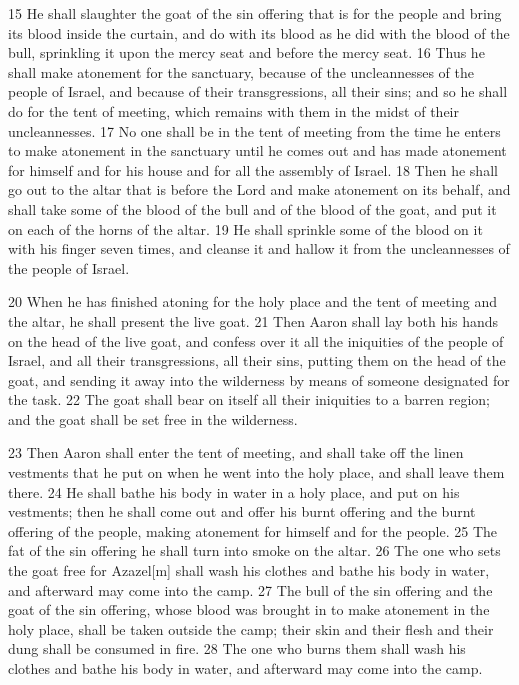 15 He shall slaughter the goat of the sin offering that is for the people and 
bring its blood inside the curtain, and do with its blood as he did with the 
blood of the bull, sprinkling it upon the mercy seat and before the mercy 
seat. 16 Thus he shall make atonement for the sanctuary, because of the 
uncleannesses of the people of Israel, and because of their transgressions, all 
their sins; and so he shall do for the tent of meeting, which remains with them 
in the midst of their uncleannesses. 17 No one shall be in the tent of meeting 
from the time he enters to make atonement in the sanctuary until he comes out 
and has made atonement for himself and for his house and for all the assembly of
Israel. 18 Then he shall go out to the altar that is before the Lord and make 
atonement on its behalf, and shall take some of the blood of the bull and of 
the blood of the goat, and put it on each of the horns of the altar. 19 He 
shall sprinkle some of the blood on it with his finger seven times, and cleanse
it and hallow it from the uncleannesses of the people of Israel.

20 When he has finished atoning for the holy place and the tent of meeting and 
the altar, he shall present the live goat. 21 Then Aaron shall lay both his 
hands on the head of the live goat, and confess over it all the iniquities of the
people of Israel, and all their transgressions, all their sins, putting them on 
the head of the goat, and sending it away into the wilderness by means of someone 
designated for the task. 22 The goat shall bear on itself all their iniquities 
to a barren region; and the goat shall be set free in the wilderness.

23 Then Aaron shall enter the tent of meeting, and shall take off the linen 
vestments that he put on when he went into the holy place, and shall leave them 
there. 24 He shall bathe his body in water in a holy place, and put on his 
vestments; then he shall come out and offer his burnt offering and the burnt 
offering of the people, making atonement for himself and for the people. 25 The
fat of the sin offering he shall turn into smoke on the altar. 26 The one who 
sets the goat free for Azazel[m] shall wash his clothes and bathe his body in 
water, and afterward may come into the camp. 27 The bull of the sin offering and
the goat of the sin offering, whose blood was brought in to make atonement in 
the holy place, shall be taken outside the camp; their skin and their flesh and 
their dung shall be consumed in fire. 28 The one who burns them shall wash his 
clothes and bathe his body in water, and afterward may come into the camp.

